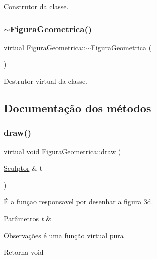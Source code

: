 Construtor da classe. 

\mbox{\label{class_figura_geometrica_a40ce7fb4b6cbf0cbe3852e342c739988}} 
\subsubsection{\texorpdfstring{$\sim$\+Figura\+Geometrica()}{~FiguraGeometrica()}}
{\footnotesize\ttfamily virtual Figura\+Geometrica\+::$\sim$\+Figura\+Geometrica (\begin{DoxyParamCaption}{ }\end{DoxyParamCaption})\hspace{0.3cm}{\ttfamily [virtual]}}



Destrutor virtual da classe. 



\subsection{Documentação dos métodos}
\mbox{\label{class_figura_geometrica_a34585fd7c0bd7378fc69c4ee208e676c}} 
\subsubsection{\texorpdfstring{draw()}{draw()}}
{\footnotesize\ttfamily virtual void Figura\+Geometrica\+::draw (\begin{DoxyParamCaption}\item[{\hyperlink{class_sculptor}{Sculptor} \&}]{t }\end{DoxyParamCaption})\hspace{0.3cm}{\ttfamily [pure virtual]}}



É a funçao responsavel por desenhar a figura 3d. 


\begin{DoxyParams}{Parâmetros}
{\em t} & \\
\hline
\end{DoxyParams}
\begin{DoxyRemark}{Observações}
é uma função virtual pura 
\end{DoxyRemark}
\begin{DoxyReturn}{Retorna}
void 
\end{DoxyReturn}


